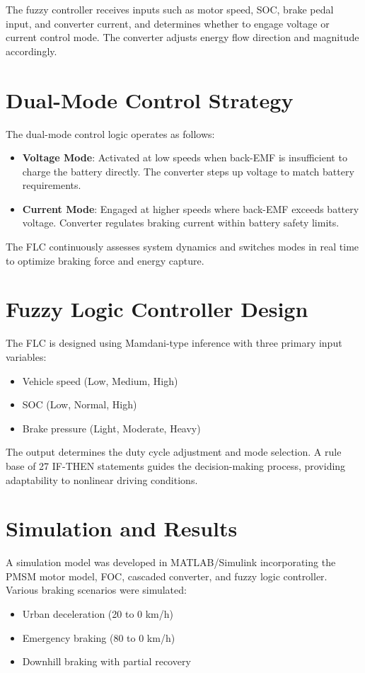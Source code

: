 \documentclass{article}
\begin{document}
The fuzzy controller receives inputs such as motor speed, SOC, brake pedal input, and converter current, and determines whether to engage voltage or current control mode. The converter adjusts energy flow direction and magnitude accordingly.

\section{Dual-Mode Control Strategy}
The dual-mode control logic operates as follows:
\begin{itemize}
    \item \textbf{Voltage Mode}: Activated at low speeds when back-EMF is insufficient to charge the battery directly. The converter steps up voltage to match battery requirements.
    \item \textbf{Current Mode}: Engaged at higher speeds where back-EMF exceeds battery voltage. Converter regulates braking current within battery safety limits.
\end{itemize}

The FLC continuously assesses system dynamics and switches modes in real time to optimize braking force and energy capture.

\section{Fuzzy Logic Controller Design}
The FLC is designed using Mamdani-type inference with three primary input variables:
\begin{itemize}
    \item Vehicle speed (Low, Medium, High)
    \item SOC (Low, Normal, High)
    \item Brake pressure (Light, Moderate, Heavy)
\end{itemize}

The output determines the duty cycle adjustment and mode selection. A rule base of 27 IF-THEN statements guides the decision-making process, providing adaptability to nonlinear driving conditions.

\section{Simulation and Results}
A simulation model was developed in MATLAB/Simulink incorporating the PMSM motor model, FOC, cascaded converter, and fuzzy logic controller. Various braking scenarios were simulated:
\begin{itemize}
    \item Urban deceleration (20 to 0 km/h)
    \item Emergency braking (80 to 0 km/h)
    \item Downhill braking with partial recovery
\end{itemize}
\end{document}
